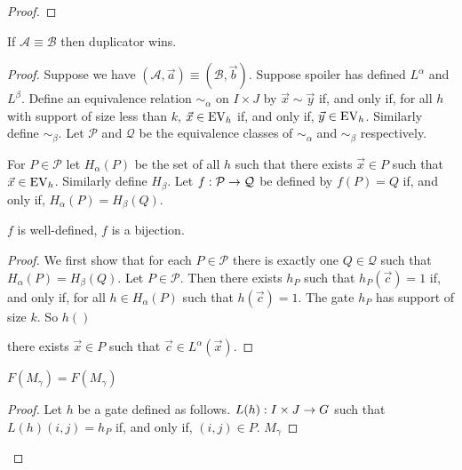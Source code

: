 \documentclass[../main/thesis.tex]{subfiles}
\begin{document}
\begin{proof}

  
\end{proof}

\begin{thm}
  If $\mathcal{A} \equiv \mathcal{B}$ then duplicator wins.
\end{thm}
\begin{proof}
  Suppose we have $(\mathcal{A}, \vec{a}) \equiv (\mathcal{B}, \vec{b})$.
  Suppose spoiler has defined $L^{\alpha}$ and $L^{\beta}$. Define an
  equivalence relation $\sim_{\alpha}$ on $I\times J$ by $\vec{x} \sim \vec{y}$
  if, and only if, for all $h$ with support of size less than $k$, $\vec{x} \in
  \text{EV}_h$ if, and only if, $\vec{y} \in \text{EV}_h$. Similarly define $\sim_{\beta}$.
  Let $\mathcal{P}$ and $\mathcal{Q}$ be the equivalence classes of
  $\sim_{\alpha}$ and $\sim_{\beta}$ respectively.

  For $P \in \mathcal{P}$ let $H_\alpha(P)$ be the set of all $h$ such that
  there exists $\vec{x} \in P$ such that $\vec{x} \in \text{EV}_h$. Similarly define
  $H_{\beta}$. Let $f : \mathcal{P} \rightarrow \mathcal{Q}$ be defined by $f (P) = Q$
  if, and only if, $H_\alpha(P) = H_\beta(Q)$.

  \begin{claim}
    $f$ is well-defined, $f$ is a bijection.
  \end{claim}
  \begin{proof}
    We first show that for each $P \in \mathcal{P}$ there is exactly one $Q \in
    \mathcal{Q}$ such that $H_\alpha (P) = H_{\beta}(Q)$. Let $P \in
    \mathcal{P}$. Then there exists $h_P$ such that $h_P(\vec{c}) = 1$ if, and
    only if, for all $h \in H_\alpha(P)$ such that $h(\vec{c}) = 1$. The gate
    $h_P$ has support of size $k$. So $h()$

    there exists $\vec{x} \in P$ such that $\vec{c}\in L^{\alpha}(\vec{x})$.
  \end{proof}

  \begin{claim}
    $F(M_{\gamma}) = F(M_{\gamma})$
  \end{claim}
  \begin{proof}
    Let $h$ be a gate defined as follows. $L(h) : I \times J \rightarrow G$ such that
    $L(h)(i,j) = h_P$ if, and only if, $(i, j) \in P$. $M_{\gamma} $
  \end{proof}
\end{proof}
  
\end{document}
